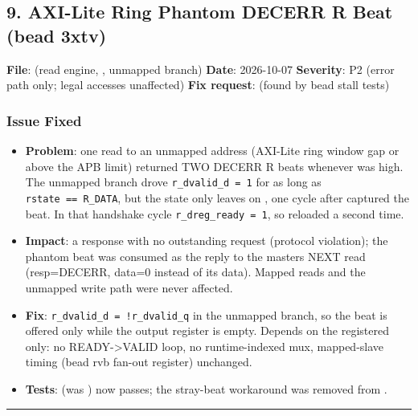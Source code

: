 \subsection{9. AXI-Lite Ring Phantom DECERR R Beat (bead 3xtv)}\label{cr:fix:fixes-index:9-axi-lite-ring-phantom-decerr-r-beat-bead-3xtv}

\begin{record}

\textbf{File}:  (read engine,
, unmapped branch) \textbf{Date}: 2026-10-07
\textbf{Severity}: P2 (error path only; legal accesses unaffected)
\textbf{Fix request}:  (found by bead
 stall tests)

\end{record}

\subsubsection{Issue Fixed}\label{cr:fix:fixes-index:issue-fixed-2}

\begin{record}

\begin{itemize}
\tightlist
\item
  \textbf{Problem}: one read to an unmapped address (AXI-Lite ring
  window gap or above the APB limit) returned TWO DECERR R beats
  whenever  was high. The unmapped branch drove
  \texttt{r\_\allowbreak{}dvalid\_\allowbreak{}d\ =\allowbreak{}\ 1} for
  as long as
  \texttt{rstate\ =\allowbreak{}=\allowbreak{}\ R\_\allowbreak{}DATA},
  but the state only leaves  on , one cycle
  after  captured the beat. In that handshake cycle
  \texttt{r\_\allowbreak{}dreg\_\allowbreak{}ready\ =\allowbreak{}\ 1},
  so  reloaded a second time.
\item
  \textbf{Impact}: a response with no outstanding request (protocol
  violation); the phantom beat was consumed as the reply to the
  master\textquotesingle s NEXT read (resp=DECERR, data=0 instead of its
  data). Mapped reads and the unmapped write path were never affected.
\item
  \textbf{Fix}:
  \texttt{r\_\allowbreak{}dvalid\_\allowbreak{}d\ =\allowbreak{}\ !r\_\allowbreak{}dvalid\_\allowbreak{}q}
  in the unmapped branch, so the beat is offered only while the output
  register is empty. Depends on the registered  only:
  no READY-\textgreater VALID loop, no runtime-indexed mux, mapped-slave
  timing (bead rvb fan-out register) unchanged.
\item
  \textbf{Tests}:
   (was
  ) now passes; the  stray-beat
  workaround was removed from
  .
\end{itemize}

\begin{center}\rule{0.5\linewidth}{0.5pt}\end{center}

\end{record}

